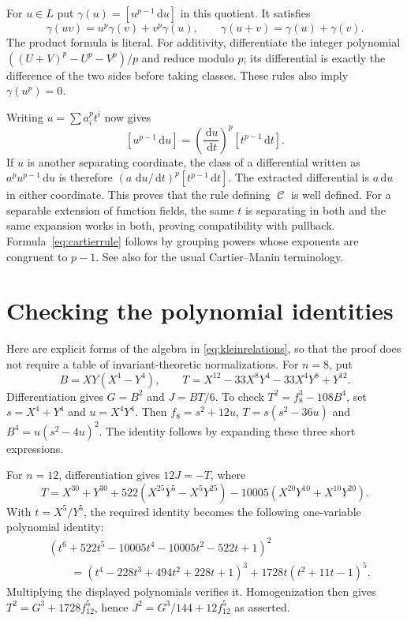 \documentclass[11pt]{article}
\numberwithin{equation}{section}
\theoremstyle{definition}
\theoremstyle{remark}
\newcommand{\dd}{\,\mathrm d}
\DeclareMathOperator{\Cart}{\mathcal C}
\begin{document}
For $u\in L$ put $\gamma(u)=[u^{p-1}\dd u]$ in this quotient.
It satisfies
\[
 \gamma(uv)=u^p\gamma(v)+v^p\gamma(u),\qquad
 \gamma(u+v)=\gamma(u)+\gamma(v).
\]
The product formula is literal. For additivity, differentiate the integer
polynomial $((U+V)^p-U^p-V^p)/p$ and reduce modulo $p$; its differential
is exactly the difference of the two sides before taking classes.
These rules also imply $\gamma(u^p)=0$.

Writing $u=\sum a_i^pt^i$ now gives
\[
 [u^{p-1}\dd u]=\left(\frac{\dd u}{\dd t}\right)^p
                         [t^{p-1}\dd t].
\]
If $u$ is another separating coordinate, the class of a differential
written as $a^{p}u^{p-1}\dd u$ is therefore
$(a\,\dd u/\dd t)^p[t^{p-1}\dd t]$.
The extracted differential is $a\dd u$ in either coordinate.
This proves that the rule defining $\Cart$ is well defined.
For a separable extension of function fields, the same $t$ is separating
in both and the same expansion works in both, proving compatibility
with pullback. Formula~\eqref{eq:cartierrule} follows by grouping powers
whose exponents are congruent to $p-1$. See also \cite[Section~2.2]{AchterHowe} for
the usual Cartier--Manin terminology.

\section{Checking the polynomial identities}\label{app:identities}

Here are explicit forms of the algebra in
\eqref{eq:kleinrelations}, so that the proof does not require a table
of invariant-theoretic normalizations. For $n=8$, put
\[
 B=XY(X^4-Y^4),\qquad
 T=X^{12}-33X^8Y^4-33X^4Y^8+Y^{12}.
\]
Differentiation gives $G=B^2$ and $J=BT/6$. To check
$T^2=f_8^3-108B^4$, set $s=X^4+Y^4$ and $u=X^4Y^4$.
Then $f_8=s^2+12u$, $T=s(s^2-36u)$ and $B^4=u(s^2-4u)^2$.
The identity follows by expanding these three short expressions.

For $n=12$, differentiation gives $12J=-T$, where
\[
 T=X^{30}+Y^{30}+522(X^{25}Y^5-X^5Y^{25})
                  -10005(X^{20}Y^{10}+X^{10}Y^{20}).
\]
With $t=X^5/Y^5$, the required identity becomes the following
one-variable polynomial identity:
\begin{align*}
 &(t^6+522t^5-10005t^4-10005t^2-522t+1)^2\\
 &\qquad=(t^4-228t^3+494t^2+228t+1)^3
              +1728t(t^2+11t-1)^5.
\end{align*}
Multiplying the displayed polynomials verifies it. Homogenization then
gives $T^2=G^3+1728f_{12}^5$, hence
$J^2=G^3/144+12f_{12}^5$ as asserted.
\end{document}
